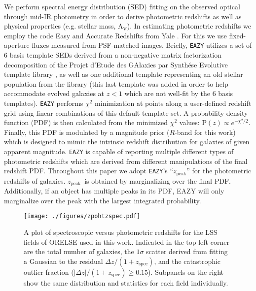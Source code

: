\documentclass[a4paper,fleqn,usenatbib]{mnras}
\def\zpeak{$z_{\mathrm{peak}}$}
\begin{document}
We perform spectral energy distribution (SED) fitting on the observed optical through mid-IR photometry in order to derive photometric redshifts as well as physical properties (e.g. stellar mass, A$_{\mathrm{V}}$).
In estimating photometric redshifts we employ the code Easy and Accurate Redshifts from Yale \citep[{\tt EAZY}:][]{Brammer2008}.
For this we use fixed-aperture fluxes measured from PSF-matched images.
Briefly, {\tt EAZY} utilizes a set of 6 basis template SEDs derived from a non-negative matrix factorization decomposition of the Projet d'Etude des GAlaxies par Synth\'ese Evolutive template library \citep[P\'EGASE:][]{Fioc1997}, as well as one additional template representing an old stellar population from the \citet{Maraston2005} library (this last template was added in order to help accommodate evolved galaxies at $z<1$ which are not well-fit by the 6 basis templates).
{\tt EAZY} performs $\chi^2$ minimization at points along a user-defined redshift grid using linear combinations of this default template set.
A probability density function (PDF) is then calculated from the minimized $\chi^2$ values: $\mathrm{P}(z) \propto e^{-\chi^2 / 2}$.
Finally, this PDF is modulated by a magnitude prior ($R$-band for this work) which is designed to mimic the intrinsic redshift distribution for galaxies of given apparent magnitude.
{\tt EAZY} is capable of reporting multiple different types of photometric redshifts which are derived from different manipulations of the final redshift PDF.
Throughout this paper we adopt {\tt EAZY}'s ``\zpeak'' for the photometric redshifts of galaxies.
\zpeak\ is obtained by marginalizing over the final PDF.
Additionally, if an object has multiple peaks in its PDF, EAZY will only marginalize over the peak with the largest integrated probability.



\begin{figure*}
	\texttt{[image: ./figures/zpohtzspec.pdf]}
    \caption{
	A plot of spectroscopic versus photometric redshifts for the LSS fields of ORELSE used in this work.
	Indicated in the top-left corner are the total number of galaxies, the $1\sigma$ scatter derived from fitting a Gaussian to the residual $\Delta z / (1 + z_{\mathrm{spec}})$, and the catastrophic outlier fraction ($|\Delta z | / (1 + z_{\mathrm{spec}}) \geq 0.15$).
	Subpanels on the right show the same distribution and statistics for each field individually.
	}
	\label{fig:zphotzspec}
\end{figure*}
\end{document}
